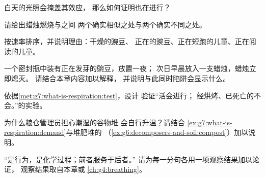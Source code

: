 \begin{exercise}[$\star$]\label{exo:g7:what-is-respiration:6}
白天的光照会掩盖其效应，
那么如何证明也在进行？
\end{exercise}

\begin{exercise}[$\star\star$]\label{exo:g7:what-is-respiration:7}
请给出蜡烛燃烧与之间
两个确实相似之处与两个确实不同之处。
\end{exercise}

\begin{exercise}[$\star\star$]\label{exo:g7:what-is-respiration:8}
按速率排序，并说明理由：干燥的豌豆、
正在的豌豆、正在短跑的儿童、正在阅读的儿童。
\end{exercise}

\begin{exercise}[$\star\star$]\label{exo:g7:what-is-respiration:9}
一个密封瓶中装有正在发芽的豌豆，放置一夜；
次日早晨放入一支蜡烛，蜡烛立即熄灭。
请结合本章内容加以解释，
并说明与此同时陷阱会显示什么。
\end{exercise}

\begin{exercise}[$\star\star$]\label{exo:g7:what-is-respiration:10}
依据\cref{met:g7:what-is-respiration:test}，设计
验证“活会进行；
经烘烤、已死亡的不会。”的实验。
\end{exercise}

\begin{exercise}[$\star\star$]\label{exo:g7:what-is-respiration:11}
为什么粮仓管理员担心潮湿的谷物堆
会自行升温？请结合
\cref{ex:g7:what-is-respiration:demand}与堆肥堆的
（\cref{ex:g6:decomposers-and-soil:compost}）加以说明。
\end{exercise}

\begin{exercise}[$\star\star\star$]\label{exo:g7:what-is-respiration:12}
“是行为，是化学过程；前者服务于后者。”
请为每一分句各用一项观察结果加以论证，
观察结果取自本章或
\cref{ch:g4:breathing}。
\end{exercise}

